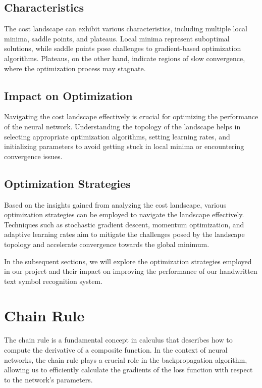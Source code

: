 \documentclass{article}
\begin{document}
\subsection{Characteristics}
The cost landscape can exhibit various characteristics, including multiple local minima, saddle points, and plateaus. Local minima represent suboptimal solutions, while saddle points pose challenges to gradient-based optimization algorithms. Plateaus, on the other hand, indicate regions of slow convergence, where the optimization process may stagnate.

\subsection{Impact on Optimization}
Navigating the cost landscape effectively is crucial for optimizing the performance of the neural network. Understanding the topology of the landscape helps in selecting appropriate optimization algorithms, setting learning rates, and initializing parameters to avoid getting stuck in local minima or encountering convergence issues.

\subsection{Optimization Strategies}
Based on the insights gained from analyzing the cost landscape, various optimization strategies can be employed to navigate the landscape effectively. Techniques such as stochastic gradient descent, momentum optimization, and adaptive learning rates aim to mitigate the challenges posed by the landscape topology and accelerate convergence towards the global minimum.

In the subsequent sections, we will explore the optimization strategies employed in our project and their impact on improving the performance of our handwritten text symbol recognition system.

\newpage
\section{Chain Rule}

The chain rule is a fundamental concept in calculus that describes how to compute the derivative of a composite function. In the context of neural networks, the chain rule plays a crucial role in the backpropagation algorithm, allowing us to efficiently calculate the gradients of the loss function with respect to the network's parameters.
\end{document}
